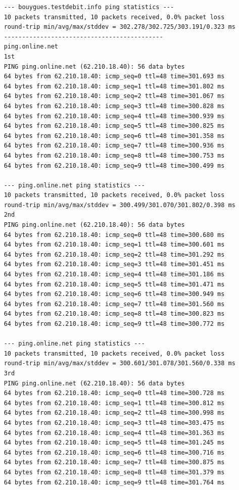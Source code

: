 \documentclass[paper=a4, fontsize=10pt]{scrartcl} %
\numberwithin{equation}{section} %
\numberwithin{figure}{section} %
\numberwithin{table}{section} %
\begin{document}
\begin{lstlisting}
    --- bouygues.testdebit.info ping statistics ---
    10 packets transmitted, 10 packets received, 0.0% packet loss
    round-trip min/avg/max/stddev = 302.278/302.725/303.191/0.323 ms
    --------------------------------------------
    ping.online.net
    1st
    PING ping.online.net (62.210.18.40): 56 data bytes
    64 bytes from 62.210.18.40: icmp_seq=0 ttl=48 time=301.693 ms
    64 bytes from 62.210.18.40: icmp_seq=1 ttl=48 time=301.802 ms
    64 bytes from 62.210.18.40: icmp_seq=2 ttl=48 time=301.067 ms
    64 bytes from 62.210.18.40: icmp_seq=3 ttl=48 time=300.828 ms
    64 bytes from 62.210.18.40: icmp_seq=4 ttl=48 time=300.939 ms
    64 bytes from 62.210.18.40: icmp_seq=5 ttl=48 time=300.825 ms
    64 bytes from 62.210.18.40: icmp_seq=6 ttl=48 time=301.358 ms
    64 bytes from 62.210.18.40: icmp_seq=7 ttl=48 time=300.936 ms
    64 bytes from 62.210.18.40: icmp_seq=8 ttl=48 time=300.753 ms
    64 bytes from 62.210.18.40: icmp_seq=9 ttl=48 time=300.499 ms
    
    --- ping.online.net ping statistics ---
    10 packets transmitted, 10 packets received, 0.0% packet loss
    round-trip min/avg/max/stddev = 300.499/301.070/301.802/0.398 ms
    2nd
    PING ping.online.net (62.210.18.40): 56 data bytes
    64 bytes from 62.210.18.40: icmp_seq=0 ttl=48 time=300.680 ms
    64 bytes from 62.210.18.40: icmp_seq=1 ttl=48 time=300.601 ms
    64 bytes from 62.210.18.40: icmp_seq=2 ttl=48 time=301.292 ms
    64 bytes from 62.210.18.40: icmp_seq=3 ttl=48 time=301.451 ms
    64 bytes from 62.210.18.40: icmp_seq=4 ttl=48 time=301.186 ms
    64 bytes from 62.210.18.40: icmp_seq=5 ttl=48 time=301.471 ms
    64 bytes from 62.210.18.40: icmp_seq=6 ttl=48 time=300.949 ms
    64 bytes from 62.210.18.40: icmp_seq=7 ttl=48 time=301.560 ms
    64 bytes from 62.210.18.40: icmp_seq=8 ttl=48 time=300.823 ms
    64 bytes from 62.210.18.40: icmp_seq=9 ttl=48 time=300.772 ms
    
    --- ping.online.net ping statistics ---
    10 packets transmitted, 10 packets received, 0.0% packet loss
    round-trip min/avg/max/stddev = 300.601/301.078/301.560/0.338 ms
    3rd
    PING ping.online.net (62.210.18.40): 56 data bytes
    64 bytes from 62.210.18.40: icmp_seq=0 ttl=48 time=300.728 ms
    64 bytes from 62.210.18.40: icmp_seq=1 ttl=48 time=300.812 ms
    64 bytes from 62.210.18.40: icmp_seq=2 ttl=48 time=300.998 ms
    64 bytes from 62.210.18.40: icmp_seq=3 ttl=48 time=303.475 ms
    64 bytes from 62.210.18.40: icmp_seq=4 ttl=48 time=301.363 ms
    64 bytes from 62.210.18.40: icmp_seq=5 ttl=48 time=301.245 ms
    64 bytes from 62.210.18.40: icmp_seq=6 ttl=48 time=300.716 ms
    64 bytes from 62.210.18.40: icmp_seq=7 ttl=48 time=300.875 ms
    64 bytes from 62.210.18.40: icmp_seq=8 ttl=48 time=301.379 ms
    64 bytes from 62.210.18.40: icmp_seq=9 ttl=48 time=301.764 ms
    

\end{lstlisting}
\end{document}
